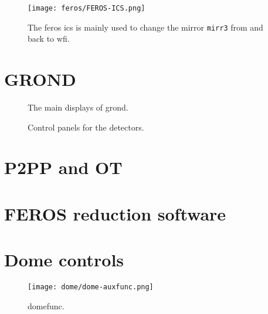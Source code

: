 \documentclass[11pt,fleqn]{book}
\begin{document}
\begin{figure}[!ht]
\centering
\texttt{[image: feros/FEROS-ICS.png]}
\caption[FEROS instrument control software panel]{The \gls{feros} \gls{ics} is mainly used to change the mirror 
\texttt{mirr3} from and back to \gls{wfi}.}
\label{fig:ferosics}
\end{figure}


\section{GROND}

\begin{figure}[!ht]
\centering
{}\hfill
{}
\caption{The main displays of \gls{grond}.}
\label{fig:grondmain}
\end{figure}

\begin{figure}[!ht]
\centering
{}\hfill
{}
\caption{Control panels for the detectors.}
\label{fig:gronddet}
\end{figure}



\section{P2PP and OT}

\section{FEROS reduction software}

\section{Dome controls}
\begin{figure}[!ht]
\centering
\texttt{[image: dome/dome-auxfunc.png]}
\caption{\gls{domefunc}.}
\label{fig:domefunc}
\end{figure}
\end{document}
